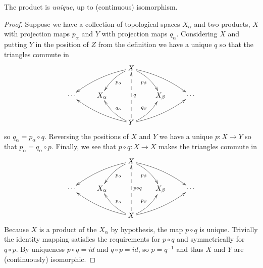       \begin{claim}
        \label{claim:uniqprod}
        The product is \emph{unique}, up to (continuous) isomorphism.
        \begin{proof}
          Suppose we have a collection of topological spaces $X_\alpha$ and two products, $X$ with projection maps $p_\alpha$ and $Y$ with projection maps $q_\alpha$.
          Considering $X$ and putting $Y$ in the position of $Z$ from the definition we have a unique $q$ so that the triangles commute in
          \begin{displaymath}
            \xymatrix{
              && X \ar@/_/[dll] \ar@/_/[dl]^{p_\alpha} \ar@/^/[dr]_{p_\beta} \ar@/^/[drr] \\
              \cdots & X_\alpha && X_\beta & \cdots\\
              && Y \ar@/^/[ull] \ar@/^/[ul]_{q_\alpha} \ar@{-->}[uu]_q \ar@/_/[ur]^{q_\beta} \ar@/_/[urr]
             }
          \end{displaymath}
          so $q_\alpha=p_\alpha\circ q$.
          Reversing the positions of $X$ and $Y$ we have a unique $p:X\rightarrow Y$ so that $p_\alpha=q_\alpha\circ p$.
          Finally, we see that $p\circ q:X\rightarrow X$ makes the triangles commute in
          \begin{displaymath}
            \xymatrix{
              && X \ar@/_/[dll] \ar@/_/[dl]^{p_\alpha} \ar@/^/[dr]_{p_\beta} \ar@/^/[drr] \\
              \cdots & X_\alpha && X_\beta & \cdots\\
              && X \ar@/^/[ull] \ar@/^/[ul]_{p_\alpha} \ar@{-->}[uu]_{p\circ q} \ar@/_/[ur]^{p_\beta} \ar@/_/[urr]
             }
          \end{displaymath}
          Because $X$ is a product of the $X_\alpha$ by hypothesis, the map $p\circ q$ is unique.
          Trivially the identity mapping satisfies the requirements for $p\circ q$ and symmetrically for $q\circ p$.
          By uniqueness $p\circ q=id$ and $q\circ p=id$,  so $p=q^{-1}$ and thus $X$ and $Y$ are (continuously) isomorphic.
        \end{proof}
      \end{claim}

